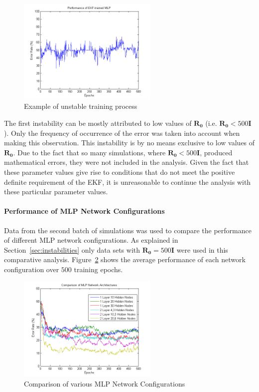 \documentclass[11pt,letterpaper,titlepage]{article}
\numberwithin{equation}{section}
\numberwithin{figure}{section}
\numberwithin{table}{section}
\begin{document}
\begin{figure}[H]
  \centering
  \includegraphics[width=0.6\textwidth]{img/mlpekf_instability}
  \caption{Example of unstable training process}
  \label{fig:mlpekf_instability}
\end{figure}


The first instability can be mostly attributed to low values of \(\mathbf{R_0}\) (i.e. \(\mathbf{R_0} < 500\mathbf{I}\)). Only the frequency of occurrence of the error was taken into account when making this observation. This instability is by no means exclusive to low values of \(\mathbf{R_0}\). Due to the fact that so many simulations, where \(\mathbf{R_0} < 500\mathbf{I}\), produced mathematical errors, they were not included in the analysis. Given the fact that these parameter values give rise to conditions that do not meet the positive definite requirement of the EKF, it is unreasonable to continue the analysis with these particular parameter values.

\paragraph{Performance of MLP Network Configurations}
\label{sec:mlp-netw-conf}

Data from the second batch of simulations was used to compare the performance of different MLP network configurations. As explained in Section~\ref{sec:instabilities} only data sets with \(\mathbf{R_0} = 500\mathbf{I}\) were used in this comparative analysis. Figure~\ref{fig:mlpekf_mlp_network_archs} shows the average performance of each network configuration over \(500\) training epochs.  

\begin{figure}[H]
  \centering
  \includegraphics[width=0.6\textwidth]{img/mlpekf_mlp_network_archs}
  \caption{Comparison of various MLP Network Configurations}
  \label{fig:mlpekf_mlp_network_archs}
\end{figure}
\end{document}
